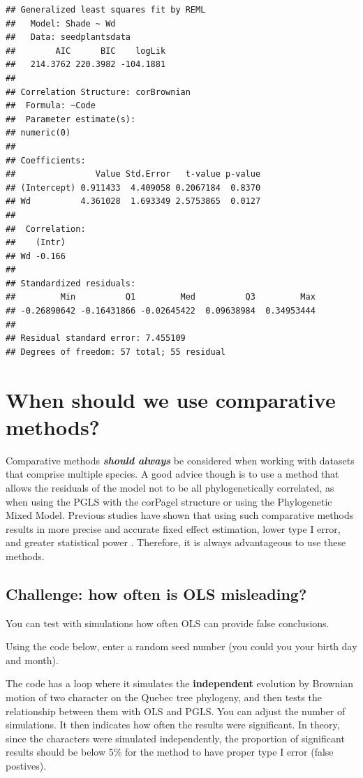 \documentclass[
]{book}
\begin{document}
\begin{verbatim}
## Generalized least squares fit by REML
##   Model: Shade ~ Wd 
##   Data: seedplantsdata 
##        AIC      BIC    logLik
##   214.3762 220.3982 -104.1881
## 
## Correlation Structure: corBrownian
##  Formula: ~Code 
##  Parameter estimate(s):
## numeric(0)
## 
## Coefficients:
##                Value Std.Error   t-value p-value
## (Intercept) 0.911433  4.409058 0.2067184  0.8370
## Wd          4.361028  1.693349 2.5753865  0.0127
## 
##  Correlation: 
##    (Intr)
## Wd -0.166
## 
## Standardized residuals:
##         Min          Q1         Med          Q3         Max 
## -0.26890642 -0.16431866 -0.02645422  0.09638984  0.34953444 
## 
## Residual standard error: 7.455109 
## Degrees of freedom: 57 total; 55 residual
\end{verbatim}

\chapter{When should we use comparative methods?}\label{when-should-we-use-comparative-methods}

Comparative methods \textbf{\emph{should always}} be considered when working with datasets that comprise multiple species. A good advice though is to use a method that allows the residuals of the model not to be all phylogenetically correlated, as when using the PGLS with the corPagel structure or using the Phylogenetic Mixed Model. Previous studies have shown that using such comparative methods results in more precise and accurate fixed effect estimation, lower type I error, and greater statistical power \citep{revell2010phylogenetic}. Therefore, it is always advantageous to use these methods.

\section{Challenge: how often is OLS misleading?}\label{challenge-how-often-is-ols-misleading}

You can test with simulations how often OLS can provide false conclusions.

Using the code below, enter a random seed number (you could you your birth day and month).

The code has a loop where it simulates the \textbf{independent} evolution by Brownian motion of two character on the Quebec tree phylogeny, and then tests the relationship between them with OLS and PGLS. You can adjust the number of simulations. It then indicates how often the results were significant. In theory, since the characters were simulated independently, the proportion of significant results should be below 5\% for the method to have proper type I error (false postives).
\end{document}
